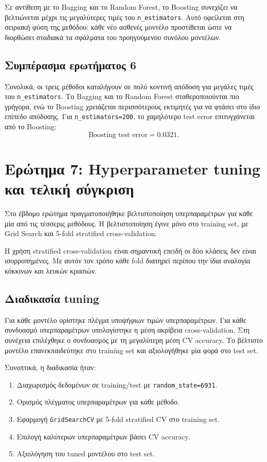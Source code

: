 \documentclass[12pt,a4paper]{article}
\newcommand{\code}[1]{\texttt{\textenglish{#1}}}
\begin{document}
Σε αντίθεση με το Bagging και το Random Forest, το Boosting συνεχίζει να
βελτιώνεται μέχρι τις μεγαλύτερες τιμές του \code{n\_estimators}. Αυτό
οφείλεται στη σειριακή φύση της μεθόδου: κάθε νέο ασθενές μοντέλο προστίθεται
ώστε να διορθώσει σταδιακά τα σφάλματα του προηγούμενου συνόλου μοντέλων.

\subsection{Συμπέρασμα ερωτήματος 6}

Συνολικά, οι τρεις μέθοδοι καταλήγουν σε πολύ κοντινή απόδοση για μεγάλες τιμές
του \code{n\_estimators}. Το Bagging και το Random Forest σταθεροποιούνται πιο
γρήγορα, ενώ το Boosting χρειάζεται περισσότερους εκτιμητές για να φτάσει στο
ίδιο επίπεδο απόδοσης. Για \code{n\_estimators=200}, το χαμηλότερο test error
επιτυγχάνεται από το Boosting:
\[
    \text{Boosting test error}=0.0321.
\]

\section{Ερώτημα 7: Hyperparameter tuning και τελική σύγκριση}

Στο έβδομο ερώτημα πραγματοποιήθηκε βελτιστοποίηση υπερπαραμέτρων για κάθε μία
από τις τέσσερις μεθόδους. Η βελτιστοποίηση έγινε μόνο στο training set, με
Grid Search και 5-fold stratified cross-validation.

Η χρήση stratified cross-validation είναι σημαντική επειδή οι δύο κλάσεις δεν
είναι ισορροπημένες. Με αυτόν τον τρόπο κάθε fold διατηρεί περίπου την ίδια
αναλογία κόκκινων και λευκών κρασιών.

\subsection{Διαδικασία tuning}

Για κάθε μοντέλο ορίστηκε πλέγμα υποψήφιων τιμών υπερπαραμέτρων. Για κάθε
συνδυασμό υπερπαραμέτρων υπολογίστηκε η μέση ακρίβεια cross-validation. Στη
συνέχεια επιλέχθηκε ο συνδυασμός με τη μεγαλύτερη μέση CV accuracy. Το
βέλτιστο μοντέλο επανεκπαιδεύτηκε στο training set και αξιολογήθηκε μία φορά
στο test set.

Συνοπτικά, η διαδικασία ήταν:

\begin{enumerate}[nosep]
    \item Διαχωρισμός δεδομένων σε training/test με \code{random\_state=6931}.
    \item Ορισμός πλέγματος υπερπαραμέτρων για κάθε μέθοδο.
    \item Εφαρμογή \code{GridSearchCV} με 5-fold stratified CV στο training set.
    \item Επιλογή καλύτερων υπερπαραμέτρων βάσει CV accuracy.
    \item Αξιολόγηση του tuned μοντέλου στο test set.
\end{enumerate}
\end{document}
